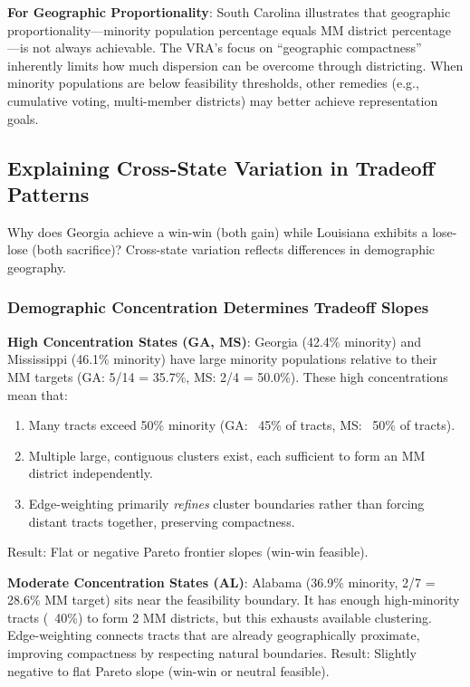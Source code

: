 \textbf{For Geographic Proportionality}: South Carolina illustrates that geographic proportionality---minority population percentage equals MM district percentage---is not always achievable. The VRA's focus on ``geographic compactness'' inherently limits how much dispersion can be overcome through districting. When minority populations are below feasibility thresholds, other remedies (e.g., cumulative voting, multi-member districts) may better achieve representation goals.

\subsection{Explaining Cross-State Variation in Tradeoff Patterns}

Why does Georgia achieve a win-win (both gain) while Louisiana exhibits a lose-lose (both sacrifice)? Cross-state variation reflects differences in demographic geography.

\subsubsection{Demographic Concentration Determines Tradeoff Slopes}

\textbf{High Concentration States (GA, MS)}: Georgia (42.4\% minority) and Mississippi (46.1\% minority) have large minority populations relative to their MM targets (GA: 5/14 = 35.7\%, MS: 2/4 = 50.0\%). These high concentrations mean that:
\begin{enumerate}
    \item Many tracts exceed 50\% minority (GA: ~45\% of tracts, MS: ~50\% of tracts).
    \item Multiple large, contiguous clusters exist, each sufficient to form an MM district independently.
    \item Edge-weighting primarily \emph{refines} cluster boundaries rather than forcing distant tracts together, preserving compactness.
\end{enumerate}

Result: Flat or negative Pareto frontier slopes (win-win feasible).

\textbf{Moderate Concentration States (AL)}: Alabama (36.9\% minority, 2/7 = 28.6\% MM target) sits near the feasibility boundary. It has enough high-minority tracts (~40\%) to form 2 MM districts, but this exhausts available clustering. Edge-weighting connects tracts that are already geographically proximate, improving compactness by respecting natural boundaries. Result: Slightly negative to flat Pareto slope (win-win or neutral feasible).

